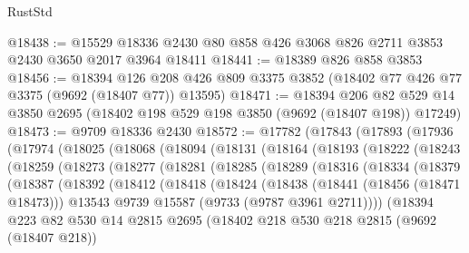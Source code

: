 \begin{lexlean}{RustStd}
\begin{coremodule}
{\begin{coremodule}
{{{{{{{{{{{{{{{{{{{{{{{{{{{{{{{{{{{{{{{{{{{{{{{{{{{{{{{@18438 := @15529 @18336 @2430 @80 @858 @426 @3068 @826 @2711 @3853 @2430 @3650 @2017 @3964 @18411
@18441 := @18389 @826 @858 @3853
@18456 := @18394
    @126
    @208
    @426
    @809
    @3375
    @3852
    (@18402 @77 @426 @77 @3375 (@9692 (@18407 @77)) @13595)
@18471 := @18394
    @206
    @82
    @529
    @14
    @3850
    @2695
    (@18402 @198 @529 @198 @3850 (@9692 (@18407 @198)) @17249)
@18473 := @9709 @18336 @2430
@18572 := @17782
    (@17843
      (@17893
        (@17936
          (@17974
            (@18025
              (@18068
                (@18094
                  (@18131
                    (@18164
                      (@18193
                        (@18222
                          (@18243
                            (@18259
                              (@18273
                                (@18277
                                  (@18281
                                    (@18285
                                      (@18289
                                        (@18316
                                          (@18334
                                            (@18379
                                              (@18387
                                                (@18392
                                                  (@18412
                                                    (@18418
                                                      (@18424
                                                        (@18438
                                                          (@18441 (@18456 (@18471 @18473)))
                                                          @13543
                                                          @9739
                                                          @15587
                                                          (@9733 (@9787 @3961 @2711))))
                                                      (@18394
                                                        @223
                                                        @82
                                                        @530
                                                        @14
                                                        @2815
                                                        @2695
                                                        (@18402
                                                          @218
                                                          @530
                                                          @218
                                                          @2815
                                                          (@9692 (@18407 @218))
}}}}}}}}}}}}}}}}}}}}}}}}}}}}}}}}}}}}}}}}}}}}}}}}}}}}}}}
\end{coremodule}}
\end{coremodule}
\end{lexlean}
